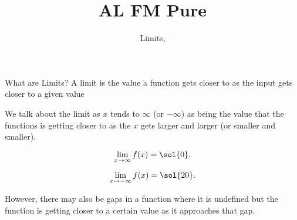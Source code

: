 \documentclass[8pt]{beamer}
\title[Pure]{{\color{aa}\Huge\adfbullet{9}}AL FM Pure}
\subtitle{Limits, \textattachfile{Limits.tex}{(TeX)}}
\begin{document}
\setlength{\abovedisplayskip}{0pt}
\setlength{\belowdisplayskip}{0pt}
\setlength{\abovedisplayshortskip}{0pt}
\setlength{\belowdisplayshortskip}{0pt}


\frame{\titlepage}

\begin{frame}[shrink=5]{What are Limits?}
	A limit is the value a function gets closer to as the input gets closer to a given value

We talk about the limit as $x$ tends to $\infty$ (or $-\infty$) as being the value that the functions is
getting closer to as the $x$ gets larger and larger (or smaller and smaller).

\noindent
\begin{minipage}{.5\linewidth}
		\centering
			\[
				\lim_{x \to \infty }f(x)=\sol{0}
			.\] 
\end{minipage}%
\begin{minipage}{.5\linewidth}
	\centering                                                                                          
		\[
			\lim_{x \to - \infty } f(x) = \sol{20}
		.\] 
	\end{minipage}

However, there may also be gaps in a function where it is undefined but the function is
getting closer to a certain value as it approaches that gap.


\end{frame}
\end{document}
